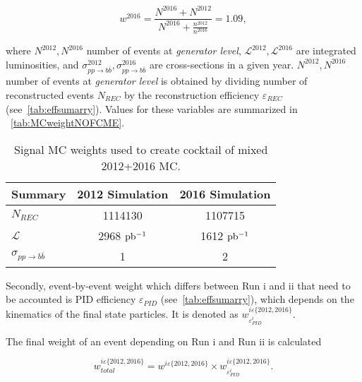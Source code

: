 \begin{equation}
w^{2016}= \frac{N^{2016}+N^{2012}}{N^{2016}+ \frac{n^{2012}}{n^{2016}}}=1.09,
\end{equation}

where $N^{2012},N^{2016}$ number of events at \textit{generator level}, $\mathcal{L}^{2012},\mathcal{L}^{2016}$ are integrated luminosities, and $\sigma^{2012}_{pp \rightarrow b \overline{b}}, \sigma^{2016}_{pp \rightarrow b \overline{b}}$ are cross-sections in a given year. $N^{2012},N^{2016}$ number of events at \textit{generator level} is obtained by dividing number of reconstructed events $N_{REC}$ by the reconstruction efficiency $\varepsilon_{REC}$ (see~\autoref{tab:effsumarry}). Values for these variables are summarized in ~\autoref{tab:MCweightNOFCME}.


\begin{table}[h]
\centering
\begin{tabular}{ l  c  c }
\toprule
Summary & 2012 Simulation & 2016 Simulation \\
\midrule


$N_{REC}$  & 1114130 & 1107715 \\
$\mathcal{L}$ & 2968 $\rm{pb^{-1}}$ & 1612 $\rm{pb^{-1}}$ \\
$\sigma_{pp \rightarrow b \overline{b}}$ & 1 & 2  \\
\bottomrule
\end{tabular}
\caption{Signal MC weights used to create cocktail of mixed 2012+2016 MC.}
\label{tab:MCweightNOFCME}
\end{table}

Secondly, event-by-event weight which differs between Run \Rn{1} and \Rn{2} that need to be accounted is PID efficiency $\varepsilon_{PID}$ (see~\autoref{tab:effsumarry}), which depends on the kinematics of the final state particles. It is denoted as $w^{i\varepsilon\{2012,2016\}}_{\varepsilon^{i}_{PID}}$. 

The final weight of an event depending on Run \Rn{1} and Run \Rn{2} is calculated 

\begin{equation}
	w^{i\varepsilon\{2012,2016\}}_{total}=  w^{i\varepsilon\{2012,2016\}} \times w^{i\varepsilon\{2012,2016\}}_{\varepsilon^{i}_{PID}}.
\end{equation}

